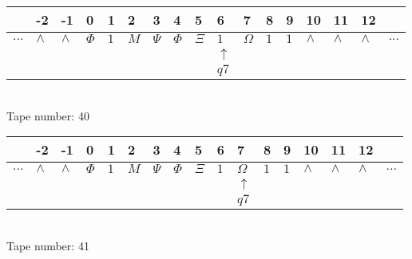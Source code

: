 \documentclass{article}
\begin{document}
\begin{table}[H]
\centering
\begin{tabular}{lllllllllllllllll}
 & -2 & -1 & 0 & 1 & 2 & 3 & 4 & 5 & 6 & 7 & 8 & 9 & 10 & 11 & 12 & \\
\hline
$...$ & \multicolumn{1}{|l|}{$\wedge$} & \multicolumn{1}{|l|}{$\wedge$} & \multicolumn{1}{|l|}{$\Phi$} & \multicolumn{1}{|l|}{$1$} & \multicolumn{1}{|l|}{$M$} & \multicolumn{1}{|l|}{$\Psi$} & \multicolumn{1}{|l|}{$\Phi$} & \multicolumn{1}{|l|}{$\Xi$} & \multicolumn{1}{|l|}{$1$} & \multicolumn{1}{|l|}{$\Omega$} & \multicolumn{1}{|l|}{$1$} & \multicolumn{1}{|l|}{$1$} & \multicolumn{1}{|l|}{$\wedge$} & \multicolumn{1}{|l|}{$\wedge$} & \multicolumn{1}{|l|}{$\wedge$} & $...$\\
\hline
&  &  &  &  &  &  &  &  & $\uparrow$ &  &  &  &  &  &  &  \\
&  &  &  &  &  &  &  &  & $ q7 $ &  &  &  &  &  &  &  \\
\end{tabular}
\\
Tape number: 40
\noindent\makebox[\linewidth]{\hdashrule{\textwidth}{1pt}{1pt}}\end{table}

\begin{table}[H]
\centering
\begin{tabular}{lllllllllllllllll}
 & -2 & -1 & 0 & 1 & 2 & 3 & 4 & 5 & 6 & 7 & 8 & 9 & 10 & 11 & 12 & \\
\hline
$...$ & \multicolumn{1}{|l|}{$\wedge$} & \multicolumn{1}{|l|}{$\wedge$} & \multicolumn{1}{|l|}{$\Phi$} & \multicolumn{1}{|l|}{$1$} & \multicolumn{1}{|l|}{$M$} & \multicolumn{1}{|l|}{$\Psi$} & \multicolumn{1}{|l|}{$\Phi$} & \multicolumn{1}{|l|}{$\Xi$} & \multicolumn{1}{|l|}{$1$} & \multicolumn{1}{|l|}{$\Omega$} & \multicolumn{1}{|l|}{$1$} & \multicolumn{1}{|l|}{$1$} & \multicolumn{1}{|l|}{$\wedge$} & \multicolumn{1}{|l|}{$\wedge$} & \multicolumn{1}{|l|}{$\wedge$} & $...$\\
\hline
&  &  &  &  &  &  &  &  &  & $\uparrow$ &  &  &  &  &  &  \\
&  &  &  &  &  &  &  &  &  & $ q7 $ &  &  &  &  &  &  \\
\end{tabular}
\\
Tape number: 41
\noindent\makebox[\linewidth]{\hdashrule{\textwidth}{1pt}{1pt}}\end{table}
\clearpage
\end{document}
